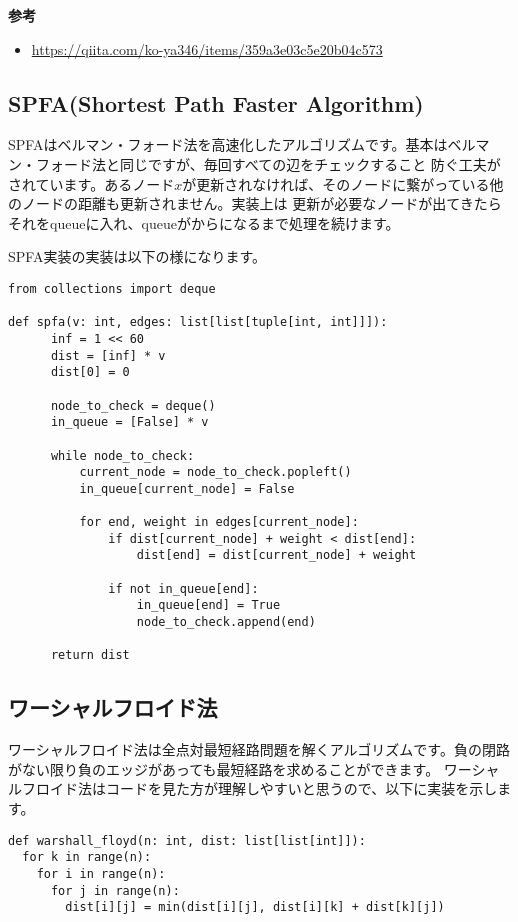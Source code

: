 \textbf{参考}

\begin{itemize}
  \item \url{https://qiita.com/ko-ya346/items/359a3e03c5e20b04c573}
\end{itemize}

\newpage

\subsection{SPFA(Shortest Path Faster Algorithm)}
SPFAはベルマン・フォード法を高速化したアルゴリズムです。基本はベルマン・フォード法と同じですが、毎回すべての辺をチェックすること
防ぐ工夫がされています。あるノード$x$が更新されなければ、そのノードに繋がっている他のノードの距離も更新されません。実装上は
更新が必要なノードが出てきたらそれをqueueに入れ、queueがからになるまで処理を続けます。

SPFA実装の実装は以下の様になります。

\begin{lstlisting}[caption=SPFAの実装, label=spfa, frame=TRBL, label={spfa}]
from collections import deque

def spfa(v: int, edges: list[list[tuple[int, int]]]):
      inf = 1 << 60
      dist = [inf] * v
      dist[0] = 0
      
      node_to_check = deque()
      in_queue = [False] * v
      
      while node_to_check:
          current_node = node_to_check.popleft()
          in_queue[current_node] = False
          
          for end, weight in edges[current_node]:
              if dist[current_node] + weight < dist[end]:
                  dist[end] = dist[current_node] + weight 
              
              if not in_queue[end]:
                  in_queue[end] = True
                  node_to_check.append(end)
      
      return dist
\end{lstlisting}

\newpage

\subsection{ワーシャルフロイド法}
ワーシャルフロイド法は全点対最短経路問題を解くアルゴリズムです。負の閉路がない限り負のエッジがあっても最短経路を求めることができます。
ワーシャルフロイド法はコードを見た方が理解しやすいと思うので、以下に実装を示します。
\begin{lstlisting}[caption=ワーシャルフロイド法の実装, label=warshall, frame=TRBL, label={warshall}]
def warshall_floyd(n: int, dist: list[list[int]]):
  for k in range(n):
    for i in range(n):
      for j in range(n):
        dist[i][j] = min(dist[i][j], dist[i][k] + dist[k][j])

\end{lstlisting}

